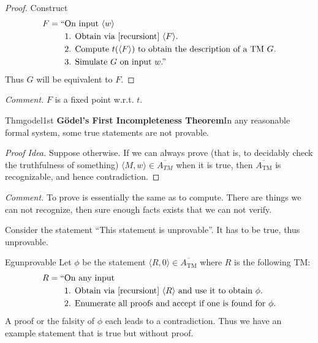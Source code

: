 \begin{proof}
  Construct
  \begin{align*}
    F=\text{``} & \text{On input }\langle w\rangle                                                  \\
                & \text{1. Obtain via \ref{recursiont} }\langle F\rangle.                           \\
                & \text{2. Compute }t(\langle F\rangle)\text{ to obtain the description of a TM }G. \\
                & \text{3. Simulate }G\text{ on input }w\text{.''}
  \end{align*}
  Thus $G$ will be equivalent to $F$.
\end{proof}

\textit{Comment.} $F$ is a fixed point w.r.t. $t$.

\begin{reference}{Thm}{godel1st}
  \textbf{Gödel's First Incompleteness Theorem}\quad In any reasonable formal system, some true statements are not provable.
\end{reference}

\begin{proof}[Proof Idea]
  Suppose otherwise. If we can always prove (that is, to decidably check the truthfulness of something) $\langle M,w\rangle\in \overline{A_{TM}}$ when it is true, then $\overline{A_{\mathrm{TM}}}$ is recognizable, and hence contradiction.
\end{proof}

\textit{Comment.} To prove is essentially the same as to compute. There are things we can not recognize, then sure enough facts exists that we can not verify.

Consider the statement ``This statement is unprovable''. It has to be true, thus unprovable.

\begin{reference}{Eg}{unprovable}
  Let $\phi$ be the statement $\langle R,0\rangle\in \overline{A_{\mathrm{TM}}}$ where $R$ is the following TM:
  \begin{align*}
    R=\text{``} & \text{On any input}                                                                      \\
                & \text{1. Obtain via \ref{recursiont} }\langle R\rangle\text{ and use it to obtain }\phi. \\
                & \text{2. Enumerate all proofs and accept if one is found for }\phi.
  \end{align*}
  A proof or the falsity of $\phi$ each leads to a contradiction. Thus we have an example statement that is true but without proof.
\end{reference}

